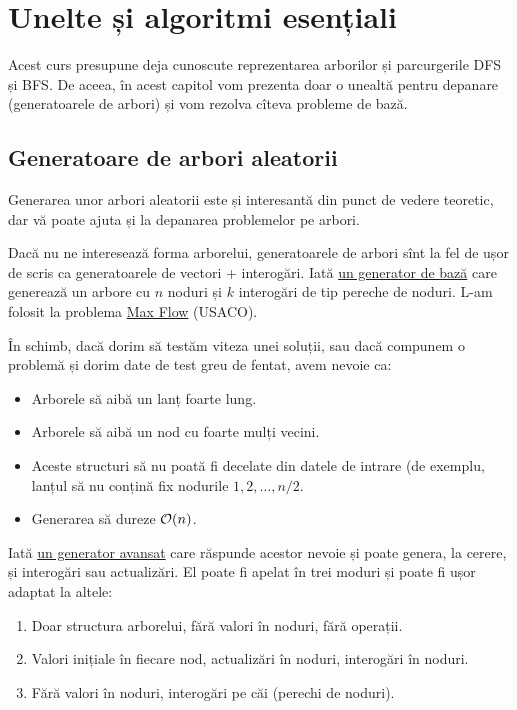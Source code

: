 \documentclass[../main.tex]{subfiles}
\begin{document}
\chapter{Unelte și algoritmi esențiali}

Acest curs presupune deja cunoscute reprezentarea arborilor și parcurgerile DFS și BFS. De aceea, în acest capitol vom prezenta doar o unealtă pentru depanare (generatoarele de arbori) și vom rezolva cîteva probleme de bază.

\section{Generatoare de arbori aleatorii}

Generarea unor arbori aleatorii este și interesantă din punct de vedere teoretic, dar vă poate ajuta și la depanarea problemelor pe arbori.

\label{problem:tree-gen-basic}
Dacă nu ne interesează forma arborelui, generatoarele de arbori sînt la fel de ușor de scris ca generatoarele de vectori + interogări. Iată \hyperref[code:tree-gen-basic]{un generator de bază} care generează un arbore cu $n$ noduri și $k$ interogări de tip pereche de noduri. L-am folosit la problema \href{https://usaco.org/index.php?page=viewproblem2&cpid=576}{Max Flow} (USACO).

În schimb, dacă dorim să testăm viteza unei soluții, sau dacă compunem o problemă și dorim date de test greu de fentat, avem nevoie ca:

\begin{itemize}
  \item Arborele să aibă un lanț foarte lung.
  \item Arborele să aibă un nod cu foarte mulți vecini.
  \item Aceste structuri să nu poată fi decelate din datele de intrare (de exemplu, lanțul să nu conțină fix nodurile $1, 2, \dots, n/2$.
  \item Generarea să dureze $\mathcal{O}(n)$.
\end{itemize}

\label{problem:tree-gen-advanced}
Iată \hyperref[code:tree-gen-advanced]{un generator avansat} care răspunde acestor nevoie și poate genera, la cerere, și interogări sau actualizări. El poate fi apelat în trei moduri și poate fi ușor adaptat la altele:

\begin{enumerate}
  \item Doar structura arborelui, fără valori în noduri, fără operații.
  \item Valori inițiale în fiecare nod, actualizări în noduri, interogări în noduri.
  \item Fără valori în noduri, interogări pe căi (perechi de noduri).
\end{enumerate}
\end{document}
